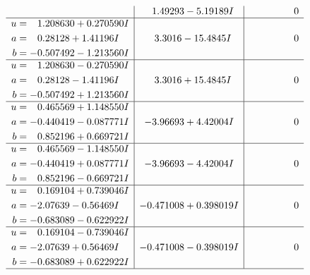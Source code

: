 \documentclass[1p]{elsarticle_modified}
\theoremstyle{definition}
\begin{document}
$$\begin{array}{c|c|c}
 & \phantom{-}1.49293 - 5.19189 I & \phantom{-0.000000 } 0 \\ \hline\begin{aligned}
u &= \phantom{-}1.208630 + 0.270590 I \\
a &= \phantom{-}0.28128 + 1.41196 I \\
b &= -0.507492 - 1.213560 I\end{aligned}
 & \phantom{-}3.3016 - 15.4845 I & \phantom{-0.000000 } 0 \\ \hline\begin{aligned}
u &= \phantom{-}1.208630 - 0.270590 I \\
a &= \phantom{-}0.28128 - 1.41196 I \\
b &= -0.507492 + 1.213560 I\end{aligned}
 & \phantom{-}3.3016 + 15.4845 I & \phantom{-0.000000 } 0 \\ \hline\begin{aligned}
u &= \phantom{-}0.465569 + 1.148550 I \\
a &= -0.440419 - 0.087771 I \\
b &= \phantom{-}0.852196 + 0.669721 I\end{aligned}
 & -3.96693 + 4.42004 I & \phantom{-0.000000 } 0 \\ \hline\begin{aligned}
u &= \phantom{-}0.465569 - 1.148550 I \\
a &= -0.440419 + 0.087771 I \\
b &= \phantom{-}0.852196 - 0.669721 I\end{aligned}
 & -3.96693 - 4.42004 I & \phantom{-0.000000 } 0 \\ \hline\begin{aligned}
u &= \phantom{-}0.169104 + 0.739046 I \\
a &= -2.07639 - 0.56469 I \\
b &= -0.683089 - 0.622922 I\end{aligned}
 & -0.471008 + 0.398019 I & \phantom{-0.000000 } 0 \\ \hline\begin{aligned}
u &= \phantom{-}0.169104 - 0.739046 I \\
a &= -2.07639 + 0.56469 I \\
b &= -0.683089 + 0.622922 I\end{aligned}
 & -0.471008 - 0.398019 I & \phantom{-0.000000 } 0\\
 \hline 
 \end{array}$$\newpage$$\begin{array}{c|c|c}  

\end{array}$$
\end{document}
